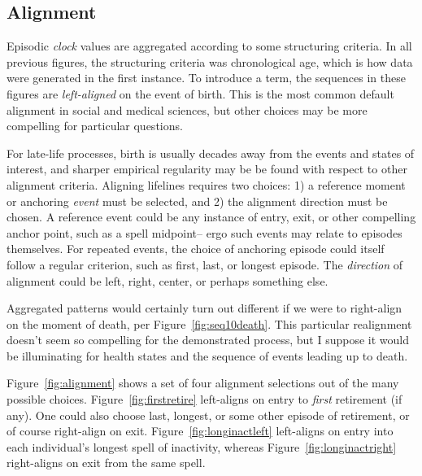 \documentclass{article}
\begin{document}
\FloatBarrier
\subsection{Alignment}
\label{sec:align}
Episodic \emph{clock} values are aggregated according to some
structuring criteria. In all previous figures, the structuring criteria was
chronological age, which is how data were generated in the first instance. To
introduce a term, the sequences in these figures are \emph{left-aligned} on the
event of birth.
This is the most common default alignment in social and medical sciences, but other choices may be more
compelling for particular questions.

For late-life processes, birth is usually decades away from the events and
states of interest, and sharper empirical regularity may be be found with
respect to other alignment criteria. Aligning lifelines requires two choices: 1) a reference moment or anchoring \emph{event} must be selected,
and 2) the alignment direction must be chosen. A reference event could be any instance of
entry, exit, or other compelling anchor point, such as a spell midpoint-- ergo
such events may relate to episodes themselves.
For repeated events, the choice of anchoring episode could itself follow a
regular criterion, such as first, last, or longest episode. The \emph{direction} of
alignment could be left, right, center, or perhaps something else.

Aggregated patterns
would certainly turn out different if we were to right-align on the moment of death, per Figure~\ref{fig:seq10death}.
This particular realignment doesn't seem so compelling for the
demonstrated process, but I suppose it would be
illuminating for health states and the sequence of events leading up to death.

Figure~\ref{fig:alignment} shows a set of four alignment selections out of the
many possible choices. Figure~\ref{fig:firstretire} left-aligns on
entry to \emph{first} retirement (if any). One could also choose last, longest,
or some other episode of retirement, or of course right-align on exit.
Figure~\ref{fig:longinactleft} left-aligns on entry into each individual's
longest spell of inactivity, whereas Figure~\ref{fig:longinactright} right-aligns on exit from
the same spell.
\end{document}

